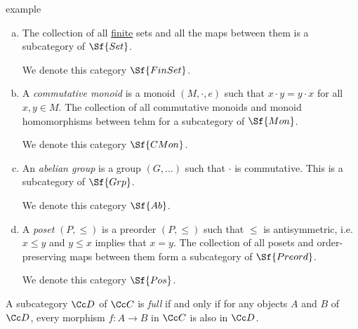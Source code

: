 \documentclass[class=article, crop=false]{standalone}
\begin{document}
\begin{understandingcheck}{example}
  \begin{enumerate}[(a)]
    \item
      The collection of all \underline{finite} sets and all the maps between them is a subcategory of $\Sf{Set}$.

      We denote this category $\Sf{FinSet}$.

    \item
      A \emph{commutative monoid} is a monoid $(M, \cdot, e)$ such that $x \cdot y = y \cdot x$ for all $x,y \in M$. The collection of all commutative monoids and monoid homomorphisms between tehm for a subcategory of $\Sf{Mon}$.

      We denote this category $\Sf{CMon}$.

    \item
      An \emph{abelian group} is a group $(G,\ldots)$ such that $\cdot$ is commutative. This is a subcategory of $\Sf{Grp}$.

      We denote this category $\Sf{Ab}$.

    \item
      A \emph{poset} $(P,\leq)$ is a preorder $(P,\leq)$ such that $\leq$ is antisymmetric, i.e. $x\leq y$ and $y \leq x$ implies that $x=y$. The collection of all posets and order-preserving maps between them form a subcategory of $\Sf{Preord}$.

      We denote this category $\Sf{Pos}$.
  \end{enumerate}
\end{understandingcheck}

\begin{defn}
  A subcategory $\Cc D$ of $\Cc C$ is \emph{full} if and only if for any objects $A$ and $B$ of $\Cc D$, every morphism $f\colon A \to B$ in  $\Cc C$ is also in $\Cc D$. 
\end{defn}
\end{document}
